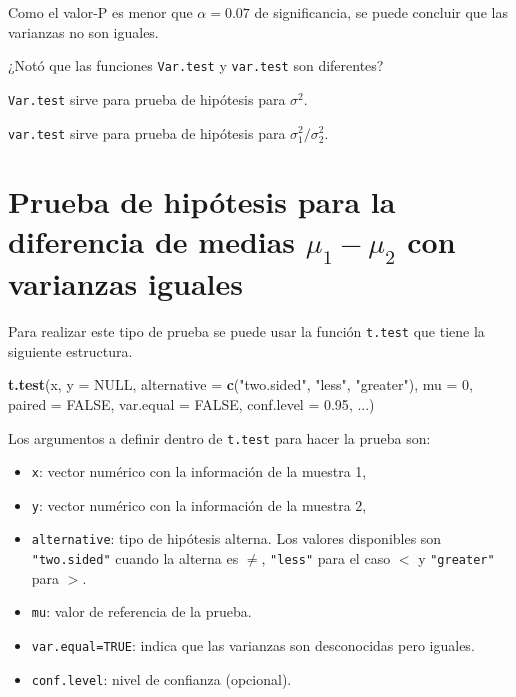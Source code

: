 \documentclass[10pt,]{krantz}
\makeatletter
\newenvironment{Shaded}{\begin{snugshade}}{\end{snugshade}}
\newcommand{\KeywordTok}[1]{\textcolor[rgb]{0.13,0.29,0.53}{\textbf{{#1}}}}
\newcommand{\DataTypeTok}[1]{\textcolor[rgb]{0.13,0.29,0.53}{{#1}}}
\newcommand{\DecValTok}[1]{\textcolor[rgb]{0.00,0.00,0.81}{{#1}}}
\newcommand{\FloatTok}[1]{\textcolor[rgb]{0.00,0.00,0.81}{{#1}}}
\newcommand{\StringTok}[1]{\textcolor[rgb]{0.31,0.60,0.02}{{#1}}}
\newcommand{\OtherTok}[1]{\textcolor[rgb]{0.56,0.35,0.01}{{#1}}}
\newcommand{\NormalTok}[1]{{#1}}
\providecommand{\tightlist}{%
  \setlength{\itemsep}{0pt}\setlength{\parskip}{0pt}}
\newenvironment{kframe}{%
\medskip{}
\setlength{\fboxsep}{.8em}
 \def\at@end@of@kframe{}%
 \ifinner\ifhmode%
  \def\at@end@of@kframe{\end{minipage}}%
  \begin{minipage}{\columnwidth}%
 \fi\fi%
 \def\FrameCommand##1{\hskip\@totalleftmargin \hskip-\fboxsep
 \colorbox{shadecolor}{##1}\hskip-\fboxsep
     \hskip-\linewidth \hskip-\@totalleftmargin \hskip\columnwidth}%
 \MakeFramed {\advance\hsize-\width
   \@totalleftmargin\z@ \linewidth\hsize
   \@setminipage}}%
 {\par\unskip\endMakeFramed%
 \at@end@of@kframe}
\renewenvironment{Shaded}{\begin{kframe}}{\end{kframe}}
\let\BeginKnitrBlock\begin \let\EndKnitrBlock\end
\makeatother
\begin{document}
Como el valor-P es menor que \(\alpha=0.07\) de significancia, se puede
concluir que las varianzas no son iguales.

\BeginKnitrBlock{rmdwarning}
¿Notó que las funciones \texttt{Var.test} y \texttt{var.test} son
diferentes?

\texttt{Var.test} sirve para prueba de hipótesis para \(\sigma^2\).

\texttt{var.test} sirve para prueba de hipótesis para
\(\sigma_1^2 / \sigma_2^2\).
\EndKnitrBlock{rmdwarning}

\section{\texorpdfstring{Prueba de hipótesis para la diferencia de
medias \(\mu_1-\mu_2\) con varianzas
iguales}{Prueba de hipótesis para la diferencia de medias \textbackslash{}mu\_1-\textbackslash{}mu\_2 con varianzas iguales}}\label{prueba-de-hipotesis-para-la-diferencia-de-medias-mu_1-mu_2-con-varianzas-iguales}

Para realizar este tipo de prueba se puede usar la función
\texttt{t.test} que tiene la siguiente estructura.

\begin{Shaded}
\begin{Highlighting}[]
\KeywordTok{t.test}\NormalTok{(x, }\DataTypeTok{y =} \OtherTok{NULL}\NormalTok{,}
       \DataTypeTok{alternative =} \KeywordTok{c}\NormalTok{(}\StringTok{"two.sided"}\NormalTok{, }\StringTok{"less"}\NormalTok{, }\StringTok{"greater"}\NormalTok{),}
       \DataTypeTok{mu =} \DecValTok{0}\NormalTok{, }\DataTypeTok{paired =} \OtherTok{FALSE}\NormalTok{, }\DataTypeTok{var.equal =} \OtherTok{FALSE}\NormalTok{,}
       \DataTypeTok{conf.level =} \FloatTok{0.95}\NormalTok{, ...)}
\end{Highlighting}
\end{Shaded}

Los argumentos a definir dentro de \texttt{t.test} para hacer la prueba
son:

\begin{itemize}
\tightlist
\item
  \texttt{x}: vector numérico con la información de la muestra 1,
\item
  \texttt{y}: vector numérico con la información de la muestra 2,
\item
  \texttt{alternative}: tipo de hipótesis alterna. Los valores
  disponibles son \texttt{"two.sided"} cuando la alterna es \(\neq\),
  \texttt{"less"} para el caso \(<\) y \texttt{"greater"} para \(>\).
\item
  \texttt{mu}: valor de referencia de la prueba.
\item
  \texttt{var.equal=TRUE}: indica que las varianzas son desconocidas
  pero iguales.
\item
  \texttt{conf.level}: nivel de confianza (opcional).
\end{itemize}
\end{document}
